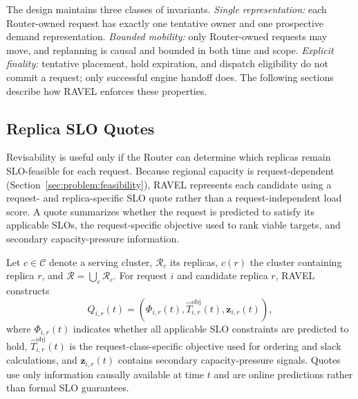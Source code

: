 \documentclass[letterpaper,twocolumn,10pt]{article}
\begin{document}
The design maintains three classes of invariants.
\emph{Single representation:} each Router-owned request has exactly one
tentative owner and one prospective demand representation.
\emph{Bounded mobility:} only Router-owned requests may move, and replanning is
causal and bounded in both time and scope.
\emph{Explicit finality:} tentative placement, hold expiration, and dispatch
eligibility do not commit a request; only successful engine handoff does.
The following sections describe how RAVEL enforces these properties.


\subsection{Replica SLO Quotes}
\label{sec:design:feasibility}

Revisability is useful only if the Router can determine which replicas remain
SLO-feasible for each request.
Because regional capacity is request-dependent
(Section~\ref{sec:problem:feasibility}), RAVEL represents each candidate using
a request- and replica-specific SLO quote rather than a request-independent
load score.
A quote summarizes whether the request is predicted to satisfy its applicable
SLOs, the request-specific objective used to rank viable targets, and
secondary capacity-pressure information.

Let $c\in\mathcal{C}$ denote a serving cluster,
$\mathcal{R}_c$ its replicas, $c(r)$ the cluster containing replica $r$, and
$\mathcal{R}=\bigcup_c\mathcal{R}_c$.
For request $i$ and candidate replica $r$, RAVEL constructs
\begin{equation}
    Q_{i,r}(t)
    =
    \left(
        \Phi_{i,r}(t),
        \widehat{T}^{\mathrm{obj}}_{i,r}(t),
        \mathbf{z}_{i,r}(t)
    \right),
    \label{eq:ravel-quote}
\end{equation}
where $\Phi_{i,r}(t)$ indicates whether all applicable SLO constraints are
predicted to hold,
$\widehat{T}^{\mathrm{obj}}_{i,r}(t)$ is the request-class-specific objective
used for ordering and slack calculations, and
$\mathbf{z}_{i,r}(t)$ contains secondary capacity-pressure signals.
Quotes use only information causally available at time $t$ and are online
predictions rather than formal SLO guarantees.
\end{document}
